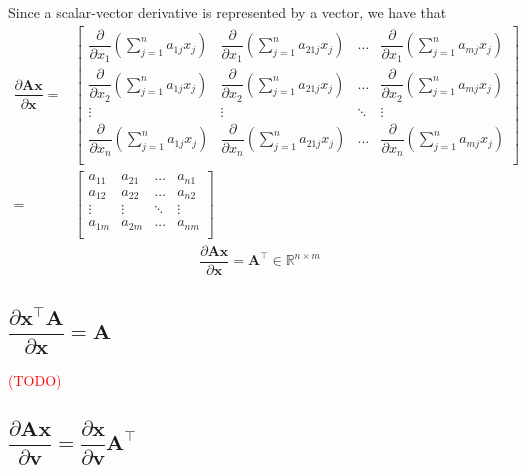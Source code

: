 \documentclass{article}
\newcommand{\trans}{\top}
\newcommand{\obs}[1]{\textcolor{red}{(#1)}}
\begin{document}
Since a scalar-vector derivative is represented by a vector, we have that
\begin{align}
    \dfrac{\partial \mathbf{A} \mathbf{x}}{\partial \mathbf{x}} = & \begin{bmatrix}
        \dfrac{\partial}{\partial x_1} \left( \sum_{j = 1}^n a_{1j}x_j \right) & 
        \dfrac{\partial}{\partial x_1} \left( \sum_{j = 1}^n a_{21j}x_j \right) & 
        \dots & 
        \dfrac{\partial}{\partial x_1} \left( \sum_{j = 1}^n a_{mj}x_j \right) \\
        \dfrac{\partial}{\partial x_2} \left( \sum_{j = 1}^n a_{1j}x_j \right) & 
        \dfrac{\partial}{\partial x_2} \left( \sum_{j = 1}^n a_{21j}x_j \right) & 
        \dots & 
        \dfrac{\partial}{\partial x_2} \left( \sum_{j = 1}^n a_{mj}x_j \right) \\
        \vdots & \vdots & \ddots & \vdots \\
        \dfrac{\partial}{\partial x_n} \left( \sum_{j = 1}^n a_{1j}x_j \right) & 
        \dfrac{\partial}{\partial x_n} \left( \sum_{j = 1}^n a_{21j}x_j \right) & 
        \dots & 
        \dfrac{\partial}{\partial x_n} \left( \sum_{j = 1}^n a_{mj}x_j \right) \\
    \end{bmatrix}  \\
    = & \begin{bmatrix}
        a_{11} & a_{21} & \dots & a_{n1} \\
        a_{12} & a_{22} & \dots & a_{n2} \\
        \vdots & \vdots & \ddots & \vdots \\
        a_{1m} & a_{2m} & \dots & a_{nm} \\
    \end{bmatrix}
\end{align}
\begin{align}
    \label{eq:lt-slution}
    \boxed{\dfrac{\partial \mathbf{A} \mathbf{x}}{\partial \mathbf{x}} = \mathbf{A}^\trans \in \mathbb{R}^{n\times m}}
\end{align}

\subsection{\(\dfrac{\partial \mathbf{x}^\top\mathbf{A}}{\partial \mathbf{x}} = \mathbf{A}\)}
\obs{TODO}

\subsection{\(\dfrac{\partial \mathbf{A}  \mathbf{x}}{\partial \mathbf{v}} = \dfrac{\partial \mathbf{x}}{\partial \mathbf{v}} \mathbf{A}^\trans\)}
\end{document}
